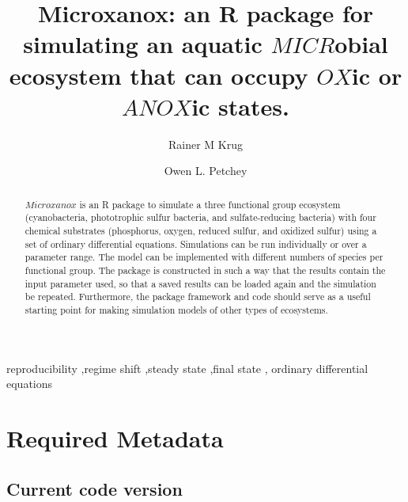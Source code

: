 \documentclass[]{elsarticle} %
\begin{document}
\begin{frontmatter}

  \title{Microxanox: an R package for simulating an aquatic \(MICR\)obial ecosystem that can occupy \(OX\)ic or \(ANOX\)ic states.}
    \author[University of Zürich]{Rainer M Krug%
  }
    \author[University of Zürich]{Owen L. Petchey%
  }
  
  \begin{abstract}
  \(Microxanox\) is an R package to simulate a three functional group ecosystem (cyanobacteria, phototrophic sulfur bacteria, and sulfate-reducing bacteria) with four chemical substrates (phosphorus, oxygen, reduced sulfur, and oxidized sulfur) using a set of ordinary differential equations. Simulations can be run individually or over a parameter range. The model can be implemented with different numbers of species per functional group. The package is constructed in such a way that the results contain the input parameter used, so that a saved results can be loaded again and the simulation be repeated. Furthermore, the package framework and code should serve as a useful starting point for making simulation models of other types of ecosystems.
  \end{abstract}
    \begin{keyword}
    reproducibility \sep regime shift \sep steady state \sep final state \sep 
    ordinary differential equations
  \end{keyword}
  
 \end{frontmatter}

\pagebreak

\hypertarget{required-metadata}{%
\section{Required Metadata}\label{required-metadata}}

\hypertarget{current-code-version}{%
\subsection{Current code version}\label{current-code-version}}
\end{document}
